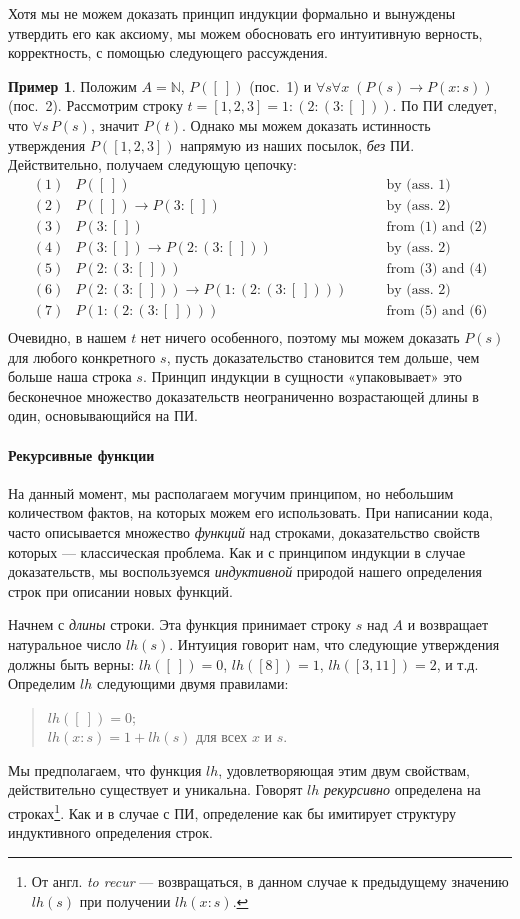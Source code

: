 \documentclass[12pt,notitlepage]{article}
\theoremstyle{plain}
\theoremstyle{definition}
\newtheorem{exm}[thm]{Пример}
\theoremstyle{plain}
\newcommand{\N}{\mathbb{N}}
\newcommand{\1}{\mathbf{1}}
\newcommand{\0}{\mathbf{0}}
\begin{document}
Хотя мы не можем доказать принцип индукции формально и вынуждены утвердить его как аксиому, мы можем обосновать его интуитивную верность, корректность, с помощью следующего рассуждения.
\begin{exm}\label{strings:ind_intuition}
	Положим $A = \N$, $P([\ ])$ (пос.~1) и  $\forall s \forall x\; (P(s) \to P(x:s))$ (пос.~2). Рассмотрим строку $t = [1,2,3] = 1 : (2 : (3 : [\ ]))$. По ПИ следует, что $\forall s\, P(s)$, значит $P(t)$. Однако мы можем доказать истинность утверждения $P([1,2,3])$ напрямую из наших посылок, \emph{без} ПИ. Действительно, получаем следующую цепочку:
	$$
	\begin{array}{rll}
		(1)&P([\ ])&\qquad\mbox{by (ass.~1)}\\
		(2)&P([\ ]) \to P(3 : [\ ])&\qquad\mbox{by (ass.~2)}\\
		(3)&P(3 : [\ ])&\qquad\mbox{from (1) and (2)}\\
		(4)&P(3 : [\ ]) \to P(2 : (3 : [\ ]))&\qquad\mbox{by (ass.~2)}\\
		(5)&P(2 : (3 : [\ ]))&\qquad\mbox{from (3) and (4)}\\
		(6)&P(2 : (3 : [\ ])) \to P(1 : (2 : (3 : [\ ])))&\qquad\mbox{by (ass.~2)}\\
		(7)&P(1 : (2 : (3 : [\ ])))&\qquad\mbox{from (5) and (6)}\\
	\end{array}
	$$
	Очевидно, в нашем $t$ нет ничего особенного, поэтому мы можем доказать $P(s)$ для любого конкретного $s$, пусть доказательство становится тем дольше, чем больше наша строка $s$. Принцип индукции в сущности «упаковывает» это бесконечное множество доказательств неограниченно возрастающей длины в один, основывающийся на ПИ.
\end{exm} 

\paragraph{Рекурсивные функции} На данный момент, мы располагаем могучим принципом, но небольшим количеством фактов, на которых можем его использовать. При написании кода, часто описывается множество \emph{функций} над строками, доказательство свойств которых --- классическая проблема. Как и с принципом индукции в случае доказательств, мы воспользуемся \emph{индуктивной} природой нашего определения строк при описании новых функций.

Начнем с \emph{длины} строки. Эта функция принимает строку $s$ над $A$ и возвращает натуральное число $lh(s)$. Интуиция говорит нам, что следующие утверждения должны быть верны: $lh([\ ]) = 0$, $lh([8]) = 1$, $lh([3,11]) = 2$, и т.д. Определим $lh$ следующими двумя правилами:
\begin{quote}
	$lh([\ ]) = 0$;\\
	$lh(x : s) = 1 + lh(s)$ для всех $x$ и $s$.
\end{quote}
Мы предполагаем, что функция $lh$, удовлетворяющая этим двум свойствам, действительно существует и уникальна. Говорят $lh$ \emph{рекурсивно} определена на строках\footnote{От англ. \emph{to recur} --- возвращаться, в данном случае к предыдущему значению $lh(s)$ при получении $lh(x: s)$.}. Как и в случае с ПИ, определение как бы имитирует структуру индуктивного определения строк.
\end{document}
